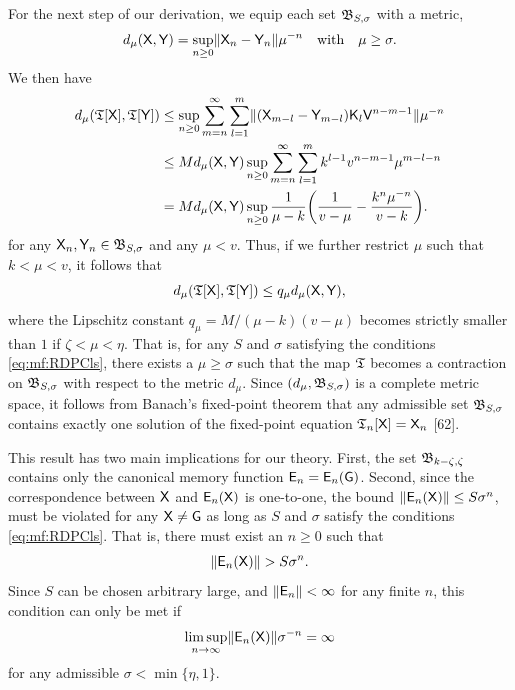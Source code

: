 \documentclass[aps,prl,reprint]{revtex4-2}
\begin{document}
For the next step of our derivation, we equip each set $\mathfrak{B}_{S,\sigma}$ with a metric,
\begin{equation}
d_\mu(\mathsf{X},\mathsf{Y}) = \sup_{n\geq 0}\lVert \mathsf{X}_n-\mathsf{Y}_n \rVert\mu^{-n}
\quad\text{with}\quad \mu\geq \sigma.
\end{equation}
We then have
\begin{align}
d_\mu (\mathfrak{T}[\mathsf{X}],\mathfrak{T}[\mathsf{Y}]) & \leq \sup_{n\geq 0} \sum_{m=n}^\infty\sum_{l=1}^m
\lVert (\mathsf{X}_{m-l} - \mathsf{Y}_{m-l})\mathsf{K}_l\mathsf{V}^{n-m-1} \rVert\mu^{-n}\\
&\leq M d_\mu(\mathsf{X},\mathsf{Y})\sup_{n\geq 0}
\sum_{m=n}^\infty\sum_{l=1}^m k^{l-1} v^{n-m-1}\mu^{m-l-n}\nonumber\\
&= M d_\mu(\mathsf{X},\mathsf{Y}) \sup_{n\geq 0} \frac{1}{\mu-k}
\biggl(\frac{1}{v-\mu}-\frac{k^n\mu^{-n}}{v-k}\biggr).\nonumber
\end{align}
for any $\mathsf{X}_n,\mathsf{Y}_n\in\mathfrak{B}_{S,\sigma}$ and any $\mu<v$.
Thus, if we further restrict $\mu$ such that $k<\mu<v$, it follows that
\begin{equation}
d_\mu (\mathfrak{T}[\mathsf{X}],\mathfrak{T}[\mathsf{Y}]) \leq q_\mu d_\mu(\mathsf{X},\mathsf{Y}),
\end{equation}
where the Lipschitz constant $q_\mu = M/(\mu-k)(v-\mu)$ becomes strictly smaller than $1$ if $\zeta < \mu < \eta$.
That is, for any $S$ and $\sigma$ satisfying the conditions \eqref{eq:mf:RDPCls}, there exists a $\mu\geq \sigma$ such that the map $\mathfrak{T}$ becomes a contraction on $\mathfrak{B}_{S,\sigma}$ with respect to the metric $d_\mu$.
Since $(d_\mu, \mathfrak{B}_{S,\sigma})$ is a complete metric space, it follows from Banach's fixed-point theorem that any admissible set $\mathfrak{B}_{S,\sigma}$ contains exactly one solution of the fixed-point equation $\mathfrak{T}_n[\mathsf{X}] = \mathsf{X}_n$ [62].

This result has two main implications for our theory.
First, the set $\mathfrak{B}_{k-\zeta,\zeta}$ contains only the canonical memory function $\mathsf{E}_n = \mathsf{E}_n(\mathsf{G})$.
Second, since the correspondence between $\mathsf{X}$ and $\mathsf{E}_n(\mathsf{X})$ is one-to-one, the bound $\lVert \mathsf{E}_n(\mathsf{X}) \rVert\leq S\sigma^n$, must be violated for any $\mathsf{X}\neq\mathsf{G}$ as long as $S$ and $\sigma$ satisfy the conditions \eqref{eq:mf:RDPCls}.
That is, there must exist an $n\geq 0$ such that
\begin{equation}
\lVert \mathsf{E}_n(\mathsf{X}) \rVert > S\sigma^n.
\end{equation}
Since $S$ can be chosen arbitrary large, and $\lVert \mathsf{E}_n \rVert<\infty$ for any finite $n$, this condition can only be met if
\begin{equation}
\limsup_{n\rightarrow\infty} \lVert \mathsf{E}_n(\mathsf{X}) \rVert\sigma^{-n} = \infty
\end{equation}
for any admissible $\sigma<\min\{\eta,1\}$.
\end{document}
